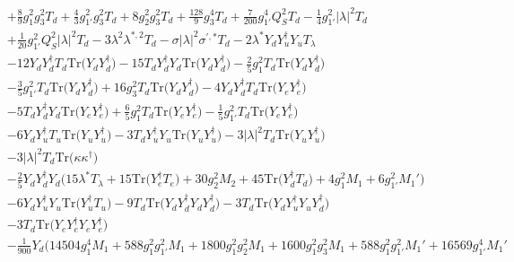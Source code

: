 {\begin{align}
 &+\frac{8}{9} g_{1}^{2} g_{3}^{2} T_d +\frac{4}{3} g_{1'}^{2} g_{3}^{2} T_d +8 g_{2}^{2} g_{3}^{2} T_d +\frac{128}{9} g_{3}^{4} T_d +\frac{7}{200} g_{1'}^{4} Q_{S}^{2} T_d -\frac{1}{4} g_{1'}^{2} |\lambda|^2 T_d \nonumber \\ 
 &+\frac{1}{20} g_{1'}^{2} Q_{S}^{2} |\lambda|^2 T_d -3 \lambda^{2} \lambda^{*,2} T_d - \sigma |\lambda|^2 \sigma^{\prime,*} T_d -2 \lambda^* {Y_d  Y_{u}^{\dagger}  Y_u} T_{\lambda} \nonumber \\ 
 &-12 {Y_d  Y_{d}^{\dagger}  T_d} \mbox{Tr}\Big({Y_d  Y_{d}^{\dagger}}\Big) -15 {T_d  Y_{d}^{\dagger}  Y_d} \mbox{Tr}\Big({Y_d  Y_{d}^{\dagger}}\Big) -\frac{2}{5} g_{1}^{2} T_d \mbox{Tr}\Big({Y_d  Y_{d}^{\dagger}}\Big) \nonumber \\ 
 &-\frac{3}{5} g_{1'}^{2} T_d \mbox{Tr}\Big({Y_d  Y_{d}^{\dagger}}\Big) +16 g_{3}^{2} T_d \mbox{Tr}\Big({Y_d  Y_{d}^{\dagger}}\Big) -4 {Y_d  Y_{d}^{\dagger}  T_d} \mbox{Tr}\Big({Y_e  Y_{e}^{\dagger}}\Big) \nonumber \\ 
 &-5 {T_d  Y_{d}^{\dagger}  Y_d} \mbox{Tr}\Big({Y_e  Y_{e}^{\dagger}}\Big) +\frac{6}{5} g_{1}^{2} T_d \mbox{Tr}\Big({Y_e  Y_{e}^{\dagger}}\Big) -\frac{1}{5} g_{1'}^{2} T_d \mbox{Tr}\Big({Y_e  Y_{e}^{\dagger}}\Big) \nonumber \\ 
 &-6 {Y_d  Y_{u}^{\dagger}  T_u} \mbox{Tr}\Big({Y_u  Y_{u}^{\dagger}}\Big) -3 {T_d  Y_{u}^{\dagger}  Y_u} \mbox{Tr}\Big({Y_u  Y_{u}^{\dagger}}\Big) -3 |\lambda|^2 T_d \mbox{Tr}\Big({Y_u  Y_{u}^{\dagger}}\Big) \nonumber \\ 
 &-3 |\lambda|^2 T_d \mbox{Tr}\Big({\kappa  \kappa^{\dagger}}\Big) \nonumber \\ 
 &-\frac{2}{5} {Y_d  Y_{d}^{\dagger}  Y_d} \Big(15 \lambda^* T_{\lambda}  + 15 \mbox{Tr}\Big({Y_{e}^{\dagger}  T_e}\Big)  + 30 g_{2}^{2} M_2  + 45 \mbox{Tr}\Big({Y_{d}^{\dagger}  T_d}\Big)  + 4 g_{1}^{2} M_1  + 6 g_{1'}^{2} M_1' \Big)\nonumber \\ 
 &-6 {Y_d  Y_{u}^{\dagger}  Y_u} \mbox{Tr}\Big({Y_{u}^{\dagger}  T_u}\Big) -9 T_d \mbox{Tr}\Big({Y_d  Y_{d}^{\dagger}  Y_d  Y_{d}^{\dagger}}\Big) -3 T_d \mbox{Tr}\Big({Y_d  Y_{u}^{\dagger}  Y_u  Y_{d}^{\dagger}}\Big) \nonumber \\ 
 &-3 T_d \mbox{Tr}\Big({Y_e  Y_{e}^{\dagger}  Y_e  Y_{e}^{\dagger}}\Big) \nonumber \\ 
 &-\frac{1}{900} Y_d \Big(14504 g_{1}^{4} M_1 +588 g_{1}^{2} g_{1'}^{2} M_1 +1800 g_{1}^{2} g_{2}^{2} M_1 +1600 g_{1}^{2} g_{3}^{2} M_1 +588 g_{1}^{2} g_{1'}^{2} M_1' +16569 g_{1'}^{4} M_1' \nonumber \\ 

\end{align}}
